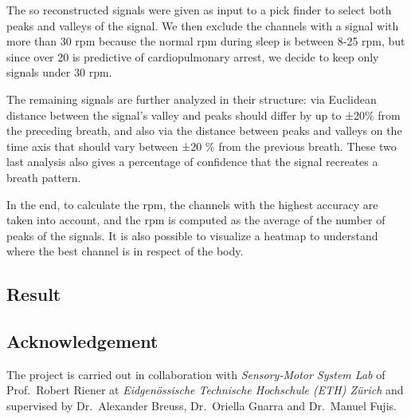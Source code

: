 \documentclass[a4paper,11pt, oneside,italian]{article}
\begin{document}
The so reconstructed signals were given as input to a pick finder to select both peaks and valleys of the signal. 
We then exclude the channels with a signal with more than 30 rpm because the normal rpm during sleep is between 8-25 rpm, but since over 20 is predictive of cardiopulmonary arrest, we decide to keep only signals under 30 rpm.

The remaining signals are further analyzed in their structure: via Euclidean distance between the signal's valley and peaks should differ by up to ±20$\%$ from the preceding breath, and also via the distance between peaks and valleys on the time axis that should vary between ±20 \% from the previous breath.
These two last analysis also gives a percentage of confidence that the signal recreates a breath pattern.

In the end, to calculate the rpm, the channels with the highest accuracy are taken into account, and the rpm is computed as the average of the number of peaks of the signals.
It is also possible to visualize a heatmap to understand where the best channel is in respect of the body. 


\subsection*{Result}

\subsection*{Acknowledgement}
The project is carried out in collaboration with \textit{Sensory-Motor System Lab} of Prof.~Robert Riener at \textit{Eidgenössische Technische Hochschule 
(ETH) Zürich} and supervised by Dr.~Alexander Breuss, Dr.~Oriella Gnarra and Dr.~Manuel Fujis.
\end{document}
